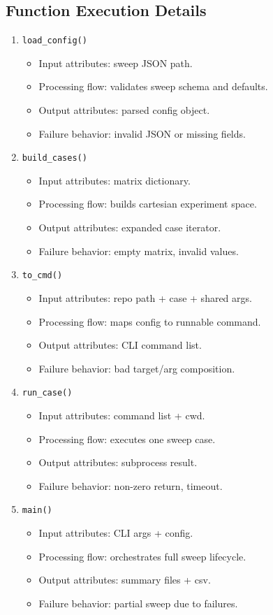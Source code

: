 \documentclass[11pt,a4paper]{article}
\begin{document}
\subsection*{Function Execution Details}
\begin{enumerate}[leftmargin=*]
  \item \texttt{load\_config()}
  \begin{itemize}[leftmargin=*]
    \item Input attributes: sweep JSON path.
    \item Processing flow: validates sweep schema and defaults.
    \item Output attributes: parsed config object.
    \item Failure behavior: invalid JSON or missing fields.
  \end{itemize}
  \item \texttt{build\_cases()}
  \begin{itemize}[leftmargin=*]
    \item Input attributes: matrix dictionary.
    \item Processing flow: builds cartesian experiment space.
    \item Output attributes: expanded case iterator.
    \item Failure behavior: empty matrix, invalid values.
  \end{itemize}
  \item \texttt{to\_cmd()}
  \begin{itemize}[leftmargin=*]
    \item Input attributes: repo path + case + shared args.
    \item Processing flow: maps config to runnable command.
    \item Output attributes: CLI command list.
    \item Failure behavior: bad target/arg composition.
  \end{itemize}
  \item \texttt{run\_case()}
  \begin{itemize}[leftmargin=*]
    \item Input attributes: command list + cwd.
    \item Processing flow: executes one sweep case.
    \item Output attributes: subprocess result.
    \item Failure behavior: non-zero return, timeout.
  \end{itemize}
  \item \texttt{main()}
  \begin{itemize}[leftmargin=*]
    \item Input attributes: CLI args + config.
    \item Processing flow: orchestrates full sweep lifecycle.
    \item Output attributes: summary files + csv.
    \item Failure behavior: partial sweep due to failures.
  \end{itemize}
\end{enumerate}
\end{document}
